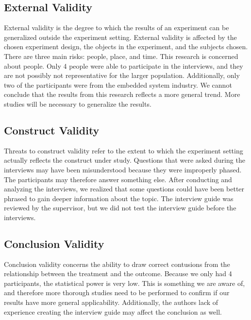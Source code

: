 \subsection{External Validity}
External validity is the degree to which the results of an experiment can be generalized outside the experiment setting. External validity is affected by the chosen experiment design, the objects in the experiment, and the subjects chosen. There are three main risks: people, place, and time. This research is concerned about people. Only 4 people were able to participate in the interviews, and they are not possibly not representative for the larger population. Additionally, only two of the participants were from the embedded system industry. We cannot conclude that the results from this research reflects a more general trend. More studies will be necessary to generalize the results.

\subsection{Construct Validity}
Threats to construct validity refer to the extent to which the experiment setting actually reflects the construct under study. Questions that were asked during the interviews may have been misunderstood because they were improperly phased. The participants may therefore answer something else. After conducting and analyzing the interviews, we realized that some questions could have been better phrased to gain deeper information about the topic. The interview guide was reviewed by the supervisor, but we did not test the interview guide before the interviews.

\subsection{Conclusion Validity}
Conclusion validity concerns the ability to draw correct contusions from the relationship between the treatment and the outcome\cite{Wohlin:2000:ESE:330775}. Because we only had 4 participants, the statistical power is very low. This is something we are aware of, and therefore more thorough studies need to be performed to confirm if our results have more general applicability. Additionally, the authors lack of experience creating the interview guide may affect the conclusion as well.



